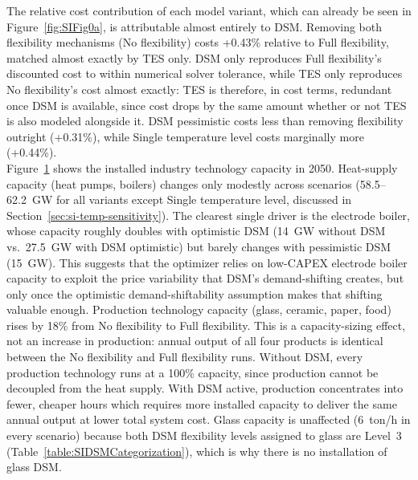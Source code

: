 The relative cost contribution of each model variant, which can already be seen in Figure~\ref{fig:SIFig0a}, is attributable almost entirely to DSM. Removing both flexibility mechanisms (No flexibility) costs +0.43\% relative to Full flexibility, matched almost exactly by TES only. DSM only reproduces Full flexibility's discounted cost to within numerical solver tolerance, while TES only reproduces No flexibility's cost almost exactly: TES is therefore, in cost terms, redundant once DSM is available, since cost drops by the same amount whether or not TES is also modeled alongside it. DSM pessimistic costs less than removing flexibility outright (+0.31\%), while Single temperature level costs marginally more (+0.44\%). \\

Figure~\ref{fig:SIFig1b} shows the installed industry technology capacity in 2050. Heat-supply capacity (heat pumps, boilers) changes only modestly across scenarios (58.5--62.2~GW for all variants except Single temperature level, discussed in Section~\ref{sec:si-temp-sensitivity}). The clearest single driver is the electrode boiler, whose capacity roughly doubles with optimistic DSM (14~GW without DSM vs.\ 27.5~GW with DSM optimistic) but barely changes with pessimistic DSM (15~GW). This suggests that the optimizer relies on low-CAPEX electrode boiler capacity to exploit the price variability that DSM's demand-shifting creates, but only once the optimistic demand-shiftability assumption makes that shifting valuable enough. Production technology capacity (glass, ceramic, paper, food) rises by 18\% from No flexibility to Full flexibility. This is a capacity-sizing effect, not an increase in production: annual output of all four products is identical between the No flexibility and Full flexibility runs. Without DSM, every production technology runs at a 100\% capacity, since production cannot be decoupled from the heat supply. With DSM active, production concentrates into fewer, cheaper hours which requires more installed capacity to deliver the same annual output at lower total system cost. Glass capacity is unaffected (6~ton/h in every scenario) because both DSM flexibility levels assigned to glass are Level~3 (Table~\ref{table:SIDSMCategorization}), which is why there is no installation of glass DSM.

\begin{figure}[h!]
    \centering
    
    \label{fig:SIFig1b}
\end{figure}

